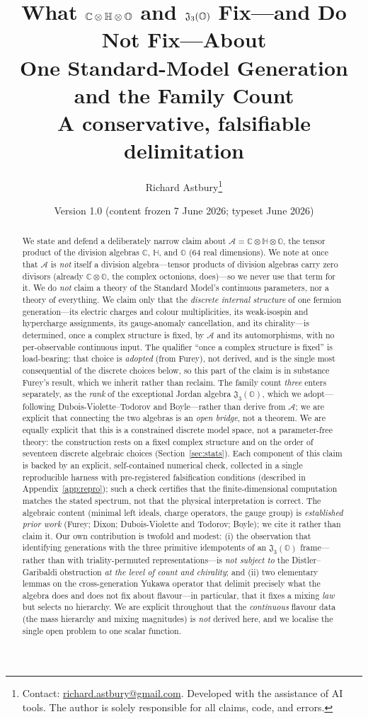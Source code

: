 \documentclass[11pt,a4paper]{article}
\title{\bfseries What $\CHO$ and $\JO$ Fix---and Do Not Fix---About\\
One Standard-Model Generation and the Family Count\\[4pt]
\large A conservative, falsifiable delimitation}
\author{Richard Astbury\thanks{Contact: \href{mailto:richard.astbury@gmail.com}{richard.astbury@gmail.com}.
Developed with the assistance of AI tools. The author is solely
responsible for all claims, code, and errors.}}
\date{Version 1.0 \quad (content frozen 7 June 2026; typeset June 2026)}
\theoremstyle{plain}
\newcommand{\CHO}{\mathbb{C}\otimes\mathbb{H}\otimes\mathbb{O}}
\newcommand{\Alg}{\mathcal{A}}
\newcommand{\JO}{\mathfrak{J}_3(\mathbb{O})}
\begin{document}
\maketitle

\begin{abstract}
\noindent
We state and defend a deliberately narrow claim about $\Alg = \CHO$, the tensor
product of the division algebras $\mathbb{C}$, $\mathbb{H}$, and $\mathbb{O}$
(64 real dimensions). We note at once that $\Alg$ is \emph{not} itself a division
algebra---tensor products of division algebras carry zero divisors (already
$\mathbb{C}\otimes\mathbb{O}$, the complex octonions, does)---so we never use that
term for it. We do \emph{not} claim a
theory of the Standard Model's continuous parameters, nor a theory of everything.
We claim only that the \emph{discrete internal structure} of one fermion
generation---its electric charges and colour multiplicities, its weak-isospin and
hypercharge assignments, its gauge-anomaly cancellation, and its chirality---is
determined, once a complex structure is fixed, by $\Alg$ and its automorphisms,
with no per-observable continuous input. The qualifier ``once a complex structure
is fixed'' is load-bearing: that choice is \emph{adopted} (from Furey), not
derived, and is the single most consequential of the discrete choices below, so
this part of the claim is in substance Furey's result, which we inherit rather
than reclaim. The family count \emph{three} enters
separately, as the \emph{rank} of the exceptional Jordan algebra $\JO$, which we
adopt---following Dubois-Violette--Todorov and Boyle---rather than derive from
$\Alg$; we are explicit that connecting the two algebras is an \emph{open
bridge}, not a theorem. We are equally explicit that this is a constrained
discrete model space, not a parameter-free theory: the construction rests on a
fixed complex structure and on the order of seventeen discrete algebraic choices
(Section~\ref{sec:stats}). Each component of this
claim is backed by an explicit, self-contained numerical check, collected in a
single reproducible harness with pre-registered falsification conditions
(described in Appendix~\ref{app:repro}); such a check certifies that the
finite-dimensional computation matches the stated spectrum, not that the physical
interpretation is correct.
The algebraic content (minimal left ideals, charge operators, the gauge group) is
\emph{established prior work} (Furey; Dixon; Dubois-Violette and Todorov; Boyle);
we cite it rather than claim it. Our own contribution is twofold and modest: (i)
the observation that identifying generations with the three primitive idempotents
of an $\JO$ frame---rather than with triality-permuted representations---is
\emph{not subject to} the Distler--Garibaldi obstruction \emph{at the level of
count and chirality}; and (ii) two elementary lemmas on the cross-generation Yukawa
operator that delimit precisely what the algebra does and does not fix about
flavour---in particular, that it fixes a mixing \emph{law} but selects no
hierarchy. We are explicit throughout that the \emph{continuous} flavour data (the
mass hierarchy and mixing magnitudes) is \emph{not} derived here, and we localise
the single open problem to one scalar function.
\end{abstract}
\end{document}
